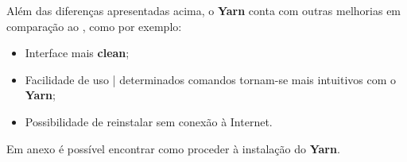 Além das diferenças apresentadas acima, o \textbf{Yarn} conta com outras melhorias em comparação ao \textbf{}, como por exemplo:

\begin{itemize}
	\item Interface mais \textbf{clean};
	\item Facilidade de uso | determinados comandos tornam-se mais intuitivos com o \textbf{Yarn};
	\item Possibilidade de reinstalar  sem conexão à Internet.
\end{itemize}


Em anexo é possível encontrar como proceder à instalação do \textbf{Yarn}.